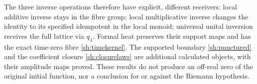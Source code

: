 \documentclass[11pt]{article}
\begin{document}
The three inverse operations therefore have explicit, different
receivers: local additive inverse stays in the fibre group;
local multiplicative inverse changes the identity to its
specified idempotent in the local monoid; universal unital
inversion receives the full lattice via $q_\lambda$.
Formal heat preserves their support maps and has the exact
time-zero fibre \eqref{sh:timekernel}. The supported boundary
\eqref{sh:punctured} and the coefficient closure
\eqref{sh:closurelaws} are additional calculated objects, with
their amplitude maps proved. These results do not produce an
off-real zero of the original initial function, nor a conclusion
for or against the Riemann hypothesis.
\end{document}
